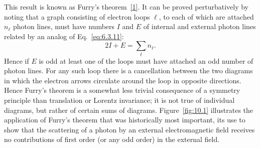 This result is known as Furry's theorem~\hyperref[ref:10.1]{[1]}. It can be proved perturbatively
by noting that a graph consisting of electron loops $\ell$, to each of which
are attached $n_\ell$ photon lines, must have numbers $I$ and $E$ of internal and
external photon lines related by an analog of Eq.~\eqref{eq:6.3.11}:
\[
  2I+E=\sum_\ell n_\ell.
\]
Hence if $E$ is odd at least one of the loops must have attached an
odd number of photon lines. For any such loop there is a cancellation
between the two diagrams in which the electron arrows circulate around
the loop in opposite directions. Hence Furry's theorem is a somewhat less
trivial consequence of a symmetry principle than translation or Lorentz
invariance; it is not true of individual diagrams, but rather of certain sums
of diagrams. Figure~\ref{fig:10.1} illustrates the application of Furry's theorem that
was historically most important, its use to show that the scattering of a
photon by an external electromagnetic field receives no contributions of
first order (or any odd order) in the external field.
